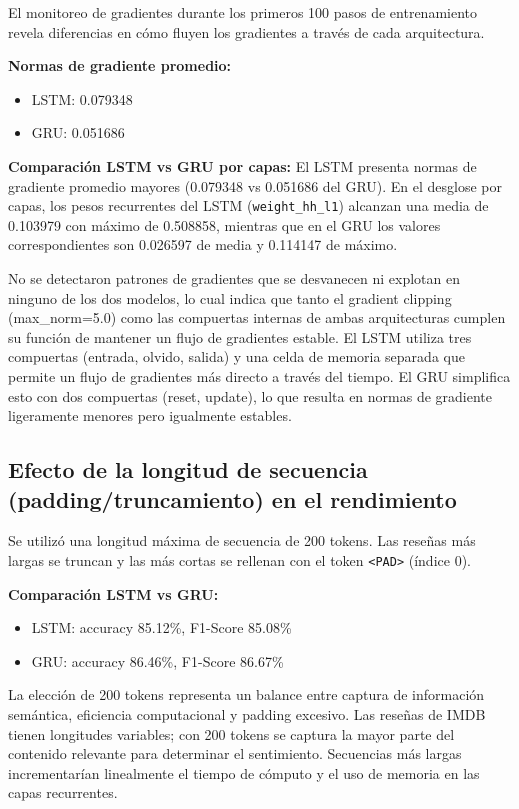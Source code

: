 El monitoreo de gradientes durante los primeros 100 pasos de entrenamiento revela diferencias en cómo fluyen los gradientes a través de cada arquitectura.

\textbf{Normas de gradiente promedio:}
\begin{itemize}
    \item LSTM: 0.079348
    \item GRU: 0.051686
\end{itemize}

\textbf{Comparación LSTM vs GRU por capas:} El LSTM presenta normas de gradiente promedio mayores (0.079348 vs 0.051686 del GRU). En el desglose por capas, los pesos recurrentes del LSTM (\texttt{weight\_hh\_l1}) alcanzan una media de 0.103979 con máximo de 0.508858, mientras que en el GRU los valores correspondientes son 0.026597 de media y 0.114147 de máximo.

No se detectaron patrones de gradientes que se desvanecen ni explotan en ninguno de los dos modelos, lo cual indica que tanto el gradient clipping (max\_norm=5.0) como las compuertas internas de ambas arquitecturas cumplen su función de mantener un flujo de gradientes estable. El LSTM utiliza tres compuertas (entrada, olvido, salida) y una celda de memoria separada que permite un flujo de gradientes más directo a través del tiempo. El GRU simplifica esto con dos compuertas (reset, update), lo que resulta en normas de gradiente ligeramente menores pero igualmente estables.

\subsection{Efecto de la longitud de secuencia (padding/truncamiento) en el rendimiento}

Se utilizó una longitud máxima de secuencia de 200 tokens. Las reseñas más largas se truncan y las más cortas se rellenan con el token \texttt{<PAD>} (índice 0).

\textbf{Comparación LSTM vs GRU:}
\begin{itemize}
    \item LSTM: accuracy 85.12\%, F1-Score 85.08\%
    \item GRU: accuracy 86.46\%, F1-Score 86.67\%
\end{itemize}

La elección de 200 tokens representa un balance entre captura de información semántica, eficiencia computacional y padding excesivo. Las reseñas de IMDB tienen longitudes variables; con 200 tokens se captura la mayor parte del contenido relevante para determinar el sentimiento. Secuencias más largas incrementarían linealmente el tiempo de cómputo y el uso de memoria en las capas recurrentes.

